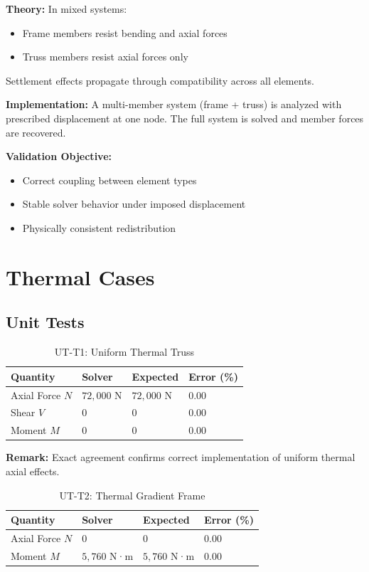 \textbf{Theory:}  
In mixed systems:
\begin{itemize}
    \item Frame members resist bending and axial forces
    \item Truss members resist axial forces only
\end{itemize}
Settlement effects propagate through compatibility across all elements.

\textbf{Implementation:}  
A multi-member system (frame + truss) is analyzed with prescribed displacement at one node. The full system is solved and member forces are recovered.

\textbf{Validation Objective:}
\begin{itemize}
    \item Correct coupling between element types
    \item Stable solver behavior under imposed displacement
    \item Physically consistent redistribution
\end{itemize}

\section{Thermal Cases}

\subsection{Unit Tests}

\begin{table}[H]
\centering
\caption{UT-T1: Uniform Thermal Truss}
\begin{tabular}{llll}
\toprule
Quantity & Solver & Expected & Error (\%) \\
\midrule
Axial Force $N$ & $72{,}000$ N & $72{,}000$ N & 0.00 \\
Shear $V$ & 0 & 0 & 0.00 \\
Moment $M$ & 0 & 0 & 0.00 \\
\bottomrule
\end{tabular}
\end{table}

\textbf{Remark:} Exact agreement confirms correct implementation of uniform thermal axial effects.

\vspace{0.4cm}

\begin{table}[H]
\centering
\caption{UT-T2: Thermal Gradient Frame}
\begin{tabular}{llll}
\toprule
Quantity & Solver & Expected & Error (\%) \\
\midrule
Axial Force $N$ & 0 & 0 & 0.00 \\
Moment $M$ & $5{,}760$ N·m & $5{,}760$ N·m & 0.00 \\
\bottomrule
\end{tabular}
\end{table}

